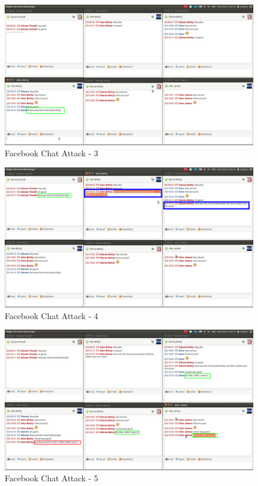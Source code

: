 \begin{figure}[H]
\centering
\includegraphics[scale=0.6, angle=90]{project/diagrams/attack3}
\caption{Facebook Chat Attack - 3}
\label{fig:attack1}
\end{figure}

\begin{figure}[H]
\centering
\includegraphics[scale=0.6, angle=90]{project/diagrams/attack4}
\caption{Facebook Chat Attack - 4}
\label{fig:attack1}
\end{figure}

\begin{figure}[H]
\centering
\includegraphics[scale=0.6, angle=90]{project/diagrams/attack5}
\caption{Facebook Chat Attack - 5}
\label{fig:attack1}
\end{figure}

